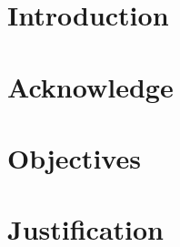 \documentclass[../../main-notes.tex]{subfiles}
\begin{document}
\section{Introduction}


\section{Acknowledge}

\section{Objectives}

\section{Justification}
\end{document}
